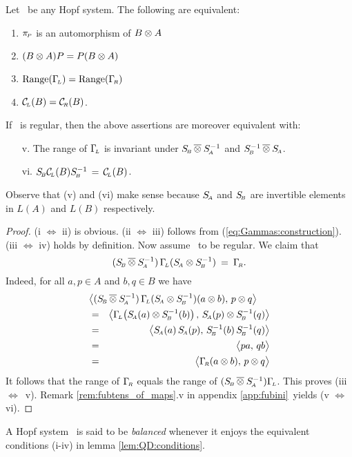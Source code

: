 \begin{lemma} \label{lem:QD:conditions}
Let\/ \pairAB\ be any Hopf system. The following are equivalent:
\begin{enumerate}
\item $\pi_{\scriptscriptstyle \! P}$ is an automorphism of\/ $B\otimes A$
\item $(B\otimes A)P = P(B\otimes A)$
\item $\mbox{\rm Range}(\Gamma_{\!\scriptscriptstyle L}) = \mbox{\rm Range}(\Gamma_{\!\scriptscriptstyle R})$
\item $\mathcal{C}_{\scriptscriptstyle \! L}(B) = \mathcal{C}_{\scriptscriptstyle \! R}(B)$.
\end{enumerate}
If\/ \pairAB\ is regular, then the above assertions are moreover equivalent with:
\begin{enumerate}
\item[v.]  The range of\/ $\Gamma_{\!\scriptscriptstyle L}$ is invariant under\/ $S_{\scriptscriptstyle \! B} \,\overline{\otimes}\: S_{\scriptscriptstyle \! A}^{-1}$
           and\/ $S_{\scriptscriptstyle \! B}^{-1} \,\overline{\otimes}\: S_{\scriptscriptstyle \! A}$.
\item[vi.] $S_{\scriptscriptstyle \! B} \mathcal{C}_{\scriptscriptstyle \! L}(B) S_{\scriptscriptstyle \! B}^{-1} \,=\, \mathcal{C}_{\scriptscriptstyle \! L}(B)$.
\end{enumerate}
\rm Observe that (v) and (vi) make sense because $S_{\scriptscriptstyle \! A}$ and $S_{\scriptscriptstyle \! B}$ are invertible
elements in $L(A)$ and $L(B)$ respectively.
\end{lemma}
\begin{proof}
(i $\Leftrightarrow$ ii) is obvious.
(ii $\Leftrightarrow$ iii) follows from (\ref{eq:Gammas:construction}).
(iii $\Leftrightarrow$ iv) holds by definition.
Now assume \pairAB\ to be regular. We claim that
$$(S_{\scriptscriptstyle \! B} \,\overline{\otimes}\: S_{\scriptscriptstyle \! A}^{-1})\, \Gamma_{\!\scriptscriptstyle L} (S_{\scriptscriptstyle \! A} \otimes S_{\scriptscriptstyle \! B}^{-1}) \:=\: \Gamma_{\!\scriptscriptstyle R}.$$
Indeed, for all $a,p\in A$ and $b,q\in B$ we have
\begin{eqnarray*}
\lefteqn{\pairM{(\SB \fubtens \SA^{-1})\,\GamL (\SA \tens \SB^{-1})(a \tens b)}{p \tens q}}
\\&=&
\pairM{\GamL \! \left( \SA(a) \tens \SB^{-1}(b)  \vertM\right)}{\SA(p) \tens  \SB^{-1}(q)}
\\&=&
\pairM{\SA(a) \, \SA(p)}{\SB^{-1}(b) \, \SB^{-1}(q)}
\\&=&
\pairM{pa}{qb}
\\&=&
\pairM{\GamR(a \tens b)}{p \tens q}
\end{eqnarray*}
It follows that the range of $\Gamma_{\!\scriptscriptstyle R}$ equals the range of $(S_{\scriptscriptstyle \! B} \,\overline{\otimes}\: S_{\scriptscriptstyle \! A}^{-1}) \Gamma_{\!\scriptscriptstyle L}$.
This proves (\mbox{iii $\Leftrightarrow$ v}).
Remark \ref{rem:fubtens_of_maps}.v in appendix \ref{app:fubini}\ yields (v $\Leftrightarrow$ vi).
\end{proof}



\begin{defn} \label{def:balanced_Hopf_system}
A Hopf system\/ \pairAB\ is said to be {\em balanced\/} whenever
it enjoys the equivalent conditions (i-iv) in lemma \ref{lem:QD:conditions}\@.
\end{defn}

